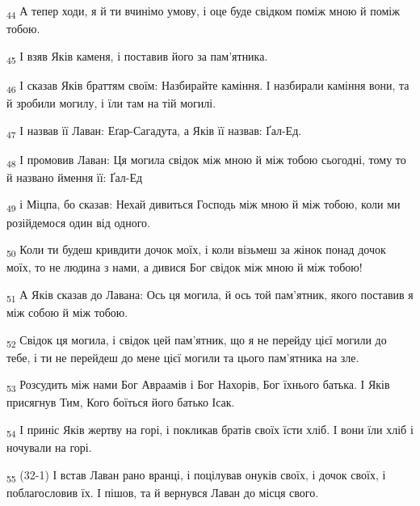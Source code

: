 \begin{tcolorbox}
\textsubscript{44} А тепер ходи, я й ти вчинімо умову, і оце буде свідком поміж мною й поміж тобою.
\end{tcolorbox}
\begin{tcolorbox}
\textsubscript{45} І взяв Яків каменя, і поставив його за пам'ятника.
\end{tcolorbox}
\begin{tcolorbox}
\textsubscript{46} І сказав Яків браттям своїм: Назбирайте каміння. І назбирали каміння вони, та й зробили могилу, і їли там на тій могилі.
\end{tcolorbox}
\begin{tcolorbox}
\textsubscript{47} І назвав її Лаван: Еґар-Сагадута, а Яків її назвав: Ґал-Ед.
\end{tcolorbox}
\begin{tcolorbox}
\textsubscript{48} І промовив Лаван: Ця могила свідок між мною й між тобою сьогодні, тому то й названо ймення її: Ґал-Ед
\end{tcolorbox}
\begin{tcolorbox}
\textsubscript{49} і Міцпа, бо сказав: Нехай дивиться Господь між мною й між тобою, коли ми розійдемося один від одного.
\end{tcolorbox}
\begin{tcolorbox}
\textsubscript{50} Коли ти будеш кривдити дочок моїх, і коли візьмеш за жінок понад дочок моїх, то не людина з нами, а дивися Бог свідок між мною й між тобою!
\end{tcolorbox}
\begin{tcolorbox}
\textsubscript{51} А Яків сказав до Лавана: Ось ця могила, й ось той пам'ятник, якого поставив я між собою й між тобою.
\end{tcolorbox}
\begin{tcolorbox}
\textsubscript{52} Свідок ця могила, і свідок цей пам'ятник, що я не перейду цієї могили до тебе, і ти не перейдеш до мене цієї могили та цього пам'ятника на зле.
\end{tcolorbox}
\begin{tcolorbox}
\textsubscript{53} Розсудить між нами Бог Авраамів і Бог Нахорів, Бог їхнього батька. І Яків присягнув Тим, Кого боїться його батько Ісак.
\end{tcolorbox}
\begin{tcolorbox}
\textsubscript{54} І приніс Яків жертву на горі, і покликав братів своїх їсти хліб. І вони їли хліб і ночували на горі.
\end{tcolorbox}
\begin{tcolorbox}
\textsubscript{55} (32-1) І встав Лаван рано вранці, і поцілував онуків своїх, і дочок своїх, і поблагословив їх. І пішов, та й вернувся Лаван до місця свого.
\end{tcolorbox}
